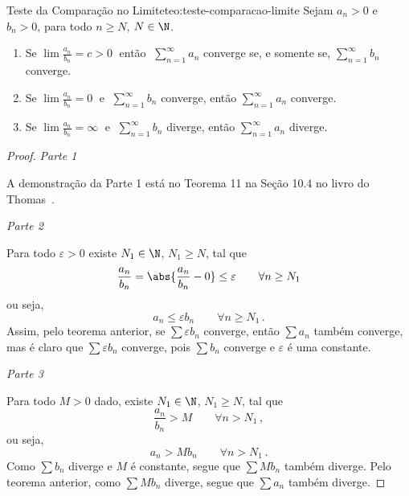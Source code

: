 \begin{teorema}{Teste da Comparação no Limite}{teo:teste-comparacao-limite}
  Sejam
  $a_n>0$ e $b_n>0$, para todo $n\geq N$, $N\in \N$.
  \begin{enumerate}
    \item
      Se
      \(
        \lim\frac{a_n}{b_n}=c>0
      \;\)
      então
      \(\;
        \sum_{n=1}^\infty a_n
      \)
      converge se, e somente se,
      \(
        \sum_{n=1}^\infty b_n
      \)
      converge.
    \item
      Se
      \(
        \lim\frac{a_n}{b_n}=0
      \;\) e
      \(\;
        \sum_{n=1}^\infty b_n
      \)
      converge, então
      \(
        \sum_{n=1}^\infty a_n
      \)
      converge.
    \item
      Se
      \(
        \lim\frac{a_n}{b_n}=\infty
      \;\) e
      \(\;
        \sum_{n=1}^\infty b_n
      \)
      diverge, então
      \(
        \sum_{n=1}^\infty a_n
      \)
      diverge.
  \end{enumerate}
\end{teorema}
\begin{proof}
  \emph{Parte 1}

  A demonstração da Parte 1 está no Teorema 11 na Seção 10.4 no livro do Thomas~\cite{thomas_2}.

  \emph{Parte 2}

  Para todo $\varepsilon>0$ existe $N_1\in\N$,  $N_1\geq N$, tal que
  \[
    \frac{a_n}{b_n} =    \abs{\frac{a_n}{b_n}-0}
                    \leq \varepsilon
    \qquad \forall n\geq N_1
  \]
  ou seja,
  \[
    a_n \leq \varepsilon b_n \qquad \forall  n\geq N_1          \,.
  \]
  Assim, pelo teorema anterior, se $\sum \varepsilon b_n$
  converge, então $\sum a_n$
  também converge, mas é claro que $\sum \varepsilon b_n$
  converge, pois $\sum b_n$
  converge e $\varepsilon$ é uma constante.

  \emph{Parte 3}

  Para todo $M>0$ dado, existe $N_1\in\N$, $N_1\geq N$, tal que
  \[
    \frac{a_n}{b_n}>M \qquad \forall n> N_1   \,,
  \]
  ou seja,
  \[
    a_n > M b_n \qquad \forall n > N_1     \,.
  \]
  Como $\sum b_n $ diverge e $M$ é constante, segue que $\sum M b_n$ também diverge.
  Pelo teorema anterior, como $\sum M b_n$ diverge, segue que $\sum a_n$ também diverge.
\end{proof}

